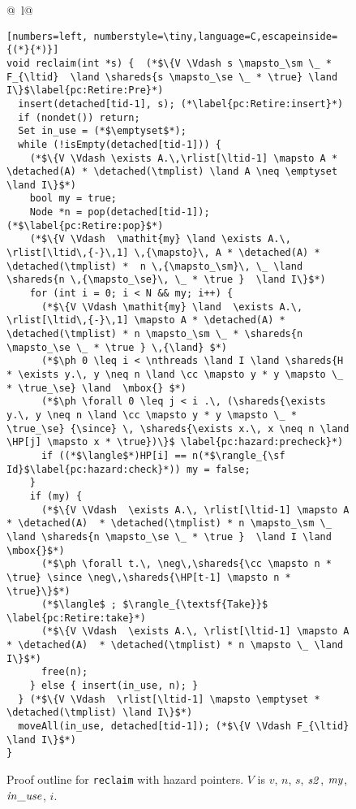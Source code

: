 \begin{figure}[t]
\begin{tabular}{@{\quad\ }l@{}}
{\figfontsize
\begin{lstlisting}[numbers=left, numberstyle=\tiny,language=C,escapeinside={(*}{*)}]
void reclaim(int *s) {  (*$\{V \Vdash s \mapsto_\sm \_ * F_{\ltid}  \land \shareds{s \mapsto_\se \_ * \true} \land I\}$\label{pc:Retire:Pre}*) 
  insert(detached[tid-1], s); (*\label{pc:Retire:insert}*)
  if (nondet()) return;
  Set in_use = (*$\emptyset$*);
  while (!isEmpty(detached[tid-1])) {
    (*$\{V \Vdash \exists A.\,\rlist[\ltid-1] \mapsto A * \detached(A) * \detached(\tmplist) \land A \neq \emptyset  \land I\}$*) 
    bool my = true;
    Node *n = pop(detached[tid-1]); (*$\label{pc:Retire:pop}$*)
    (*$\{V \Vdash  \mathit{my} \land \exists A.\, \rlist[\ltid\,{-}\,1] \,{\mapsto}\, A * \detached(A) * \detached(\tmplist) *  n \,{\mapsto_\sm}\, \_ \land \shareds{n \,{\mapsto_\se}\, \_ * \true }  \land I\}$*)
    for (int i = 0; i < N && my; i++) {
      (*$\{V \Vdash \mathit{my} \land  \exists A.\, \rlist[\ltid\,{-}\,1] \mapsto A * \detached(A) * \detached(\tmplist) * n \mapsto_\sm \_ * \shareds{n \mapsto_\se \_ * \true } \,{\land} $*)
      (*$\ph 0 \leq i < \nthreads \land I \land \shareds{H * \exists y.\, y \neq n \land \cc \mapsto y * y \mapsto \_ * \true_\se} \land  \mbox{} $*)
      (*$\ph \forall 0 \leq j < i .\, (\shareds{\exists y.\, y \neq n \land \cc \mapsto y * y \mapsto \_ * \true_\se} {\since} \, \shareds{\exists x.\, x \neq n \land \HP[j] \mapsto x * \true})\}$ \label{pc:hazard:precheck}*)
      if ((*$\langle$*)HP[i] == n(*$\rangle_{\sf Id}$\label{pc:hazard:check}*)) my = false;
    }
    if (my) {
      (*$\{V \Vdash  \exists A.\, \rlist[\ltid-1] \mapsto A * \detached(A)  * \detached(\tmplist) * n \mapsto_\sm \_ \land \shareds{n \mapsto_\se \_ * \true }  \land I \land  \mbox{}$*)
      (*$\ph \forall t.\, \neg\,\shareds{\cc \mapsto n *  \true} \since \neg\,\shareds{\HP[t-1] \mapsto n * \true}\}$*)
      (*$\langle$ ; $\rangle_{\textsf{Take}}$ \label{pc:Retire:take}*) 
      (*$\{V \Vdash  \exists A.\, \rlist[\ltid-1] \mapsto A * \detached(A)  * \detached(\tmplist) * n \mapsto \_ \land I\}$*)
      free(n);
    } else { insert(in_use, n); }  
  } (*$\{V \Vdash  \rlist[\ltid-1] \mapsto \emptyset * \detached(\tmplist) \land I\}$*)   
  moveAll(in_use, detached[tid-1]); (*$\{V \Vdash F_{\ltid} \land I\}$*)
}
\end{lstlisting}
}
\end{tabular}
\caption{\label{fig:Retire}\small Proof outline for \texttt{reclaim} with hazard pointers.
$V$ is $v$, $n$, $s$, ${\it s2}$, ${\it my}$, ${\it in\_use}$, $i$.}
\end{figure}

